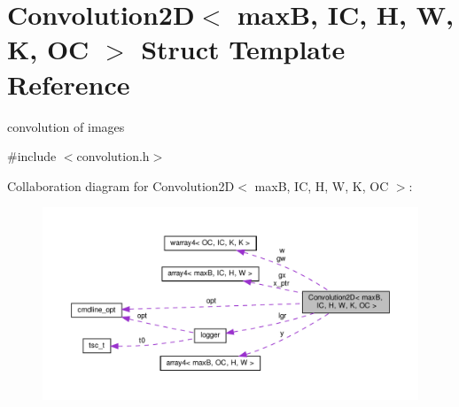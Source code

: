 \hypertarget{structConvolution2D}{}\section{Convolution2D$<$ maxB, IC, H, W, K, OC $>$ Struct Template Reference}
\label{structConvolution2D}


convolution of images  




{\ttfamily \#include $<$convolution.\+h$>$}



Collaboration diagram for Convolution2D$<$ maxB, IC, H, W, K, OC $>$\+:
\nopagebreak
\begin{figure}[H]
\begin{center}
\leavevmode
\includegraphics[width=350pt]{structConvolution2D__coll__graph}
\end{center}
\end{figure}
